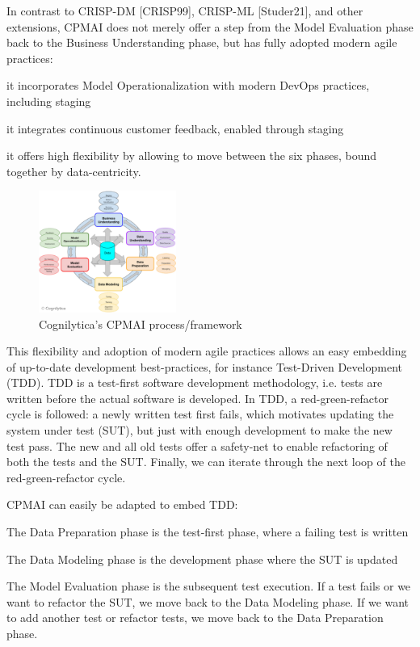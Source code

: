 \documentclass[twocolumn]{article}
\begin{document}
In contrast to CRISP-DM [CRISP99], CRISP-ML [Studer21], and other extensions, CPMAI does not merely offer a step from the Model Evaluation phase back to the Business Understanding phase, but has fully adopted modern agile practices: 
\begin{compactitem}
\item it incorporates Model Operationalization with modern DevOps practices, including staging
\item it integrates continuous customer feedback, enabled through staging
\item it offers high flexibility by allowing to move between the six phases, bound together by data-centricity.
\end{compactitem}

\begin{figure}[hbt!]
  \begin{center}
  \vspace{-4mm}
\includegraphics[width=0.4\textwidth]{figures/cpmai}
  \vspace{-4mm}
\caption{Cognilytica’s CPMAI process/framework}
\label{fig:cpmai}
\end{center}
\end{figure}

This flexibility and adoption of modern agile practices allows an easy embedding of up-to-date development best-practices, for instance Test-Driven Development (TDD). TDD is a test-first software development methodology, i.e. tests are written before the actual software is developed. In TDD, a red-green-refactor cycle is followed: a newly written test first fails, which motivates updating the system under test (SUT), but just with enough development to make the new test pass. The new and all old tests offer a safety-net to enable refactoring of both the tests and the SUT. Finally, we can iterate through the next loop of the red-green-refactor cycle.

CPMAI can easily be adapted to embed TDD:
\begin{compactitem}
\item The Data Preparation phase is the test-first phase, where a failing test is written
\item The Data Modeling phase is the development phase where the SUT is updated
\item The Model Evaluation phase is the subsequent test execution. If a test fails or we want to refactor the SUT, we move back to the Data Modeling phase. If we want to add another test or refactor tests, we move back to the Data Preparation phase.
\end{compactitem}
\end{document}
